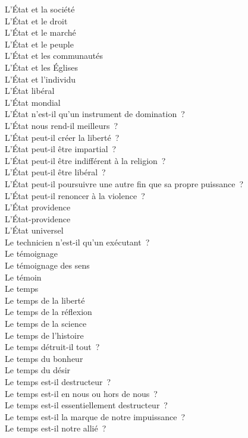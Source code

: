 \documentclass[a4paper,12pt]{article}
\begin{document}
L'État et la société \\
L'État et le droit \\
L'État et le marché \\
L'État et le peuple \\
L'État et les communautés \\
L'État et les Églises \\
L'État et l'individu \\
L'État libéral \\
L'État mondial \\
L'État n'est-il qu'un instrument de domination ? \\
L'État nous rend-il meilleurs ? \\
L'État peut-il créer la liberté ? \\
L'État peut-il être impartial ? \\
L'État peut-il être indifférent à la religion ? \\
L'État peut-il être libéral ? \\
L'État peut-il poursuivre une autre fin que sa propre puissance ? \\
L'État peut-il renoncer à la violence ? \\
L'État providence \\
L'État-providence \\
L'État universel \\
Le technicien n'est-il qu'un exécutant ? \\
Le témoignage \\
Le témoignage des sens \\
Le témoin \\
Le temps \\
Le temps de la liberté \\
Le temps de la réflexion \\
Le temps de la science \\
Le temps de l'histoire \\
Le temps détruit-il tout ? \\
Le temps du bonheur \\
Le temps du désir \\
Le temps est-il destructeur ? \\
Le temps est-il en nous ou hors de nous ? \\
Le temps est-il essentiellement destructeur ? \\
Le temps est-il la marque de notre impuissance ? \\
Le temps est-il notre allié ? \\
\end{document}
